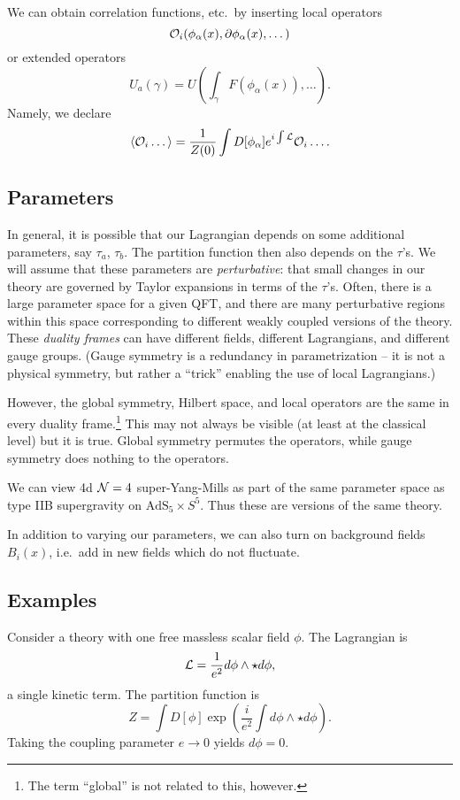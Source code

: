 We can obtain correlation functions, etc.\ by inserting local operators
\[
	\mathcal{O}_i(\phi_\alpha(x), \partial \phi_\alpha(x), \dots)
\]
or extended operators
\[
	U_a(\gamma) = U\left(\int_\gamma F(\phi_\alpha(x)), \dots\right).
\]
Namely, we declare
\[
	\langle \mathcal{O}_i \dots \rangle = \frac{1}{Z(0)} \int D[\phi_\alpha] e^{i \int \mathcal{L}} \mathcal{O}_i \dots.
\]

\subsection{Parameters}

In general, it is possible that our Lagrangian depends on some additional parameters, say $\tau_a$, $\tau_b$.
The partition function then also depends on the $\tau$'s.
We will assume that these parameters are \emph{perturbative}: that small changes in our theory are governed by Taylor expansions in terms of the $\tau$'s.
Often, there is a large parameter space for a given QFT, and there are many perturbative regions within this space corresponding to different weakly coupled versions of the theory.
These \emph{duality frames} can have different fields, different Lagrangians, and different gauge groups.
(Gauge symmetry is a redundancy in parametrization -- it is not a physical symmetry, but rather a ``trick'' enabling the use of local Lagrangians.)

However, the global symmetry, Hilbert space, and local operators are the same in every duality frame.\footnote{The term ``global'' is not related to this, however.}
This may not always be visible (at least at the classical level) but it is true.
Global symmetry permutes the operators, while gauge symmetry does nothing to the operators.

\begin{ex}
	We can view 4d $\mathcal{N} = 4$ super-Yang-Mills as part of the same parameter space as type IIB supergravity on $\mathrm{AdS}_5 \times S^5$.
	Thus these are versions of the same theory.
\end{ex}

In addition to varying our parameters, we can also turn on background fields $B_i(x)$, i.e.\ add in new fields which do not fluctuate.

\subsection{Examples}

Consider a theory with one free massless scalar field $\phi$.
The Lagrangian is
\[
	\mathcal{L} = \frac{1}{e^2} d \phi \wedge \star d \phi,
\]
a single kinetic term.
The partition function is
\[
	Z = \int D[\phi] \exp\left( \frac{i}{e^2} \int d\phi \wedge \star d\phi \right).
\]
Taking the coupling parameter $e \to 0$ yields $d\phi = 0$.

